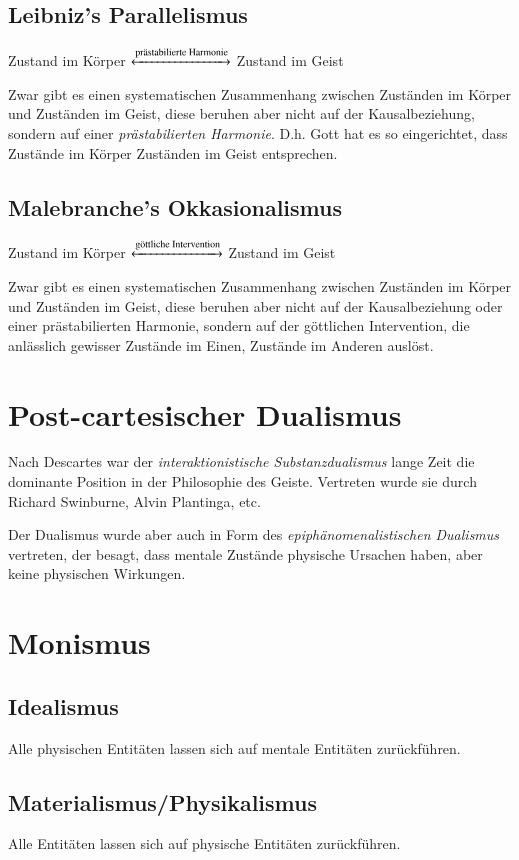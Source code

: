 \documentclass[../main.tex]{subfiles}
\begin{document}
\subsection{Leibniz's Parallelismus}
\begin{warningbox}
	Zustand im Körper $\xleftrightarrow{\text{prästabilierte Harmonie}}$ Zustand im Geist
\end{warningbox}
Zwar gibt es einen systematischen Zusammenhang zwischen Zuständen im Körper und Zuständen im Geist, diese beruhen aber nicht auf der Kausalbeziehung, sondern auf einer \textit{prästabilierten Harmonie}. D.h. Gott hat es so eingerichtet, dass Zustände im Körper Zuständen im Geist entsprechen.

\subsection{Malebranche's Okkasionalismus}
\begin{warningbox}
	Zustand im Körper $\xleftrightarrow{\text{göttliche Intervention}}$ Zustand im Geist
\end{warningbox}
Zwar gibt es einen systematischen Zusammenhang zwischen Zuständen im Körper und Zuständen im Geist, diese beruhen aber nicht auf der Kausalbeziehung oder einer prästabilierten Harmonie, sondern auf der göttlichen Intervention, die anlässlich gewisser Zustände im Einen, Zustände im Anderen auslöst. 


\section{Post-cartesischer Dualismus}
Nach Descartes war der \textit{interaktionistische Substanzdualismus} lange Zeit die dominante Position in der Philosophie des Geiste. Vertreten wurde sie durch Richard Swinburne, Alvin Plantinga, etc.

Der Dualismus wurde aber auch in Form des \textit{epiphänomenalistischen Dualismus} vertreten, der besagt, dass mentale Zustände physische Ursachen haben, aber keine physischen Wirkungen.  

\section{Monismus}
\subsection{Idealismus}
Alle physischen Entitäten lassen sich auf mentale Entitäten zurückführen.
\subsection{Materialismus/Physikalismus}
Alle Entitäten lassen sich auf physische Entitäten zurückführen.
\end{document}
